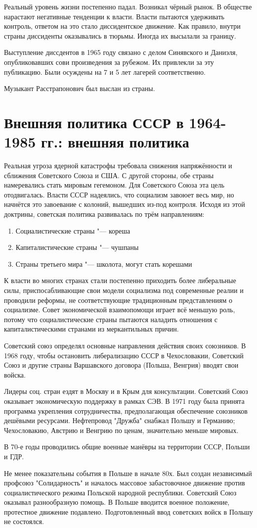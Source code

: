 \documentclass{article}
\begin{document}
Реальный уровень жизни постепенно падал. Возникал чёрный рынок. В обществе нарастают негативные тенденции к власти. Власти пытаются удерживать контроль, ответом на это стало диссидентское движение. Как правило, внутри страны диссиденты оказывались в тюрьмы. Иногда их высылали за границу.

Выступление диссдентов в 1965 году связано с делом Синявского и Даниэля, опубликовавших сови произведения за рубежом. Их привлекли за эту публикацию. Были осуждены на 7 и 5 лет лагерей соответственно.

Музыкант Расстрапонович был выслан из страны. 

\section{Внешняя политика СССР в 1964-1985 гг.: внешняя политика}
Реальная угроза ядерной катастрофы требовала снижения напряжённости и сближения Советского Союза и США. С другой стороны, обе страны намеревались стать мировым гегемоном. Для Советского Союза эта цель отодвигалась. Власти СССР надеялись, что социализм завоюет весь мир, но начнётся это завоевание с колоний, вышедших из-под контроля. Исходя из этой доктрины, советская политика развивалась по трём направлениям:
\\
\begin{enumerate}
    \item Социалистические страны "--- кореша
    \item Капиталистические страны "--- чушпаны
    \item Страны третьего мира "--- школота, могут стать корешами
\end{enumerate}

К власти во многих странах стали постепенно приходить более либеральные силы, приспосабливающие свои модели социализма под современные реалии и проводили реформы, не соответствующие традиционным представлениям о социализме. Совет экономической взаимопомощи играет всё меньшую роль, потому что социалистические страны пытаются наладить отношения с капиталистическими странами из меркантильных причин.

Советский союз определял основные направления действия своих союзников. В 1968 году, чтобы остановить либерализацию СССР в Чехословакии, Советский Союз и другие страны Варшавского договора (Польша, Венгрия) вводят свои войска.

Лидеры соц. стран ездят в Москву и в Крым для консультации. Советский Союз оказывает экономическую поддержку в рамках СЭВ. В 1971 году была принята программа укрепления сотрудничества, предполагающая обеспечение союзников дешёвыми ресурсами. Нефтепровод "Дружба" снабжал Польшу и Германию; Чехословакию, Австрию и Венгрию по ценам, значительно меньше мировых.

В 70-е годы проводились общие военные манёвры на территории СССР, Польши и ГДР.

Не менее показательны события в Польше в начале 80х. Был создан независимый профсоюз "Солидарность" и началось массовое забастовочное движение против социалистического режима Польской народной республики. Советский Союз оказывал разнообразную помощь. В Польше вводится военное положение, протестное движение подавлено. Подготовленный ввод советских войск в Польшу не состоялся.
\end{document}
